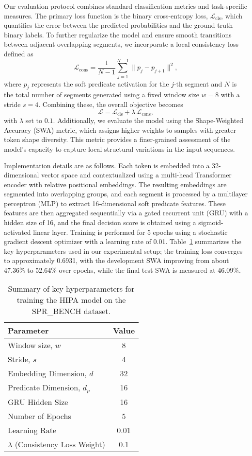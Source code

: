 \documentclass[11pt]{article}
\begin{document}
Our evaluation protocol combines standard classification metrics and task-specific measures. The primary loss function is the binary cross-entropy loss, $\mathcal{L}_{\text{cls}}$, which quantifies the error between the predicted probabilities and the ground-truth binary labels. To further regularize the model and ensure smooth transitions between adjacent overlapping segments, we incorporate a local consistency loss defined as
\[
\mathcal{L}_{\text{cons}} = \frac{1}{N-1} \sum_{j=1}^{N-1} \|p_j - p_{j+1}\|^2,
\]
where $p_j$ represents the soft predicate activation for the $j$-th segment and $N$ is the total number of segments generated using a fixed window size $w=8$ with a stride $s=4$. Combining these, the overall objective becomes
\[
\mathcal{L} = \mathcal{L}_{\text{cls}} + \lambda\, \mathcal{L}_{\text{cons}},
\]
with $\lambda$ set to $0.1$. Additionally, we evaluate the model using the Shape-Weighted Accuracy (SWA) metric, which assigns higher weights to samples with greater token shape diversity. This metric provides a finer-grained assessment of the model’s capacity to capture local structural variations in the input sequences.

Implementation details are as follows. Each token is embedded into a 32-dimensional vector space and contextualized using a multi-head Transformer encoder with relative positional embeddings. The resulting embeddings are segmented into overlapping groups, and each segment is processed by a multilayer perceptron (MLP) to extract 16-dimensional soft predicate features. These features are then aggregated sequentially via a gated recurrent unit (GRU) with a hidden size of 16, and the final decision score is obtained using a sigmoid-activated linear layer. Training is performed for 5 epochs using a stochastic gradient descent optimizer with a learning rate of 0.01. Table~\ref{tab:exp-param} summarizes the key hyperparameters used in our experimental setup; the training loss converges to approximately 0.6931, with the development SWA improving from about 47.36\% to 52.64\% over epochs, while the final test SWA is measured at 46.09\%.

\begin{table}[h]
\centering
\begin{tabular}{lc}
\hline
Parameter & Value \\
\hline
Window size, $w$ & 8 \\
Stride, $s$ & 4 \\
Embedding Dimension, $d$ & 32 \\
Predicate Dimension, $d_p$ & 16 \\
GRU Hidden Size & 16 \\
Number of Epochs & 5 \\
Learning Rate & 0.01 \\
$\lambda$ (Consistency Loss Weight) & 0.1 \\
\hline
\end{tabular}
\caption{Summary of key hyperparameters for training the HIPA model on the SPR\_BENCH dataset.}
\label{tab:exp-param}
\end{table}
\end{document}
